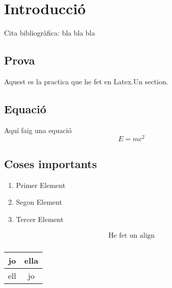 \chapter{Introducció}
\label{c:intro}

Cita bibliogràfica: \cite{TP} bla bla bla
\section {Prova}
Aquest es la practica que he fet en Latex.Un section.
\section{Equació}
Aquí faig una equació $$ E = mc^2 $$

\section{Coses importants}
\begin{enumerate}
  \item Primer Element
  \item Segon Element
  \item Tercer Element
\end{enumerate}

\date{\today}


\begin{align}
  \text{He fet un align} \\
\end{align}

\begin{tabular}{|c|c|}
 \hline
 jo & ella \\
 \hline
 ell & jo \\
 \hline
\end{tabular}

